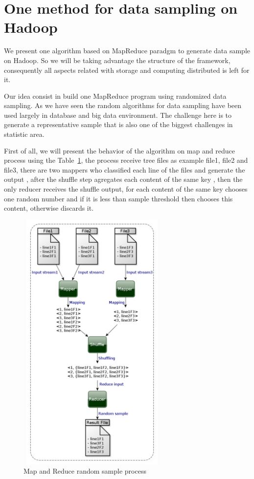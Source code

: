 \section{One method for data sampling on Hadoop}

We present one algorithm based on MapReduce paradgm to generate data sample on Hadoop.
So we will be taking advantage the structure of the framework, consequently all
aspects related with storage and computing distributed is left for it.

Our idea consist in build one MapReduce program using randomized data sampling.
As we have seen the random algorithms for data sampling have been used largely in
database and big data environment. The challenge here is to generate a representative
sample that is also one of the biggest challenges in statistic area.

First of all, we will present the behavior of the algorithm on map and reduce process
using the Table~\ref{fig:sampleProcess}, the process receive tree files as example
file1, file2 and file3, there are two mappers who classified each line of the files
and generate the output , after the shuffle step
agregates each content of the same key
,
then the only reducer receives the shuffle output, for each content of the same key
chooses one random number and if it is less than sample threshold then chooses this
content, otherwise discards it.

\begin{figure}[htbp]
	\centering
	\includegraphics[width=280px,height=500px]{img/sampleProcess.png}
	\caption{Map and Reduce random sample process}\label{fig:sampleProcess}
\end{figure}

